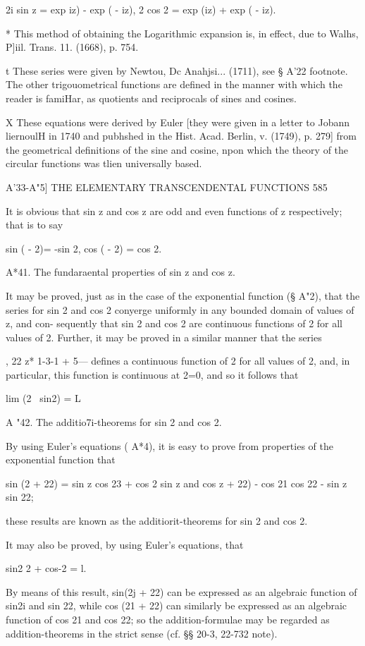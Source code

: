 2i sin z = exp iz) - exp ( - iz), 2 cos 2 = exp (iz) + exp ( - iz).

* This method of obtaining the Logarithmic expansion is, in effect,
due to Walhs, P]iil. Trans. 11. (1668), p. 754.

t These series were given by Newtou, Dc Anahjsi... (1711), see § A'22
footnote. The other trigouometrical functions are defined in the
manner with which the reader is famiHar, as quotients and reciprocals
of sines and cosines.

X These equations were derived by Euler [they were given in a letter
to Jobann liernoulH in 1740 and pubhshed in the Hist. Acad. Berlin, v.
(1749), p. 279] from the geometrical definitions of the sine and
cosine, npon which the theory of the circular functions was tlien
universally based.



A'33-A"5] THE ELEMENTARY TRANSCENDENTAL FUNCTIONS 585

It is obvious that sin z and cos z are odd and even functions of z
respectively; that is to say

sin ( - 2)= -sin 2, cos ( - 2) = cos 2.

A*41. The fundaraental properties of sin z and cos z.

It may be proved, just as in the case of the exponential function (§
A"2), that the series for sin 2 and cos 2 conyerge uniformly in any
bounded domain of values of z, and con- sequently that sin 2 and cos 2
are continuous functions of 2 for all values of 2. Further, it may be
proved in a similar manner that the series

, 22 z* 1-3-1 + 5--- defines a continuous function of 2 for all values
of 2, and, in particular, this function is continuous at 2=0, and so
it follows that

lim (2~ sin2) = L

A "42. The additio7i-theorems for sin 2 and cos 2.

By using Euler's equations ( A*4), it is easy to prove from properties
of the exponential function that

sin (2 + 22) = sin z cos 23 + cos 2 sin z and cos z + 22) - cos 21 cos
22 - sin z sin 22;

these results are known as the additiorit-theorems for sin 2 and cos
2.

It may also be proved, by using Euler's equations, that

sin2 2 + cos-2 = l.

By means of this result, sin(2j + 22) can be expressed as an algebraic
function of sin2i and sin 22, while cos (21 + 22) can similarly be
expressed as an algebraic function of cos 21 and cos 22; so the
addition-formulae may be regarded as addition-theorems in the strict
sense (cf. §§ 20-3, 22-732 note).

